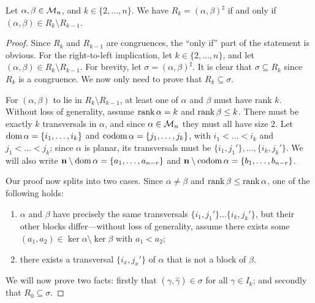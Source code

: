 \begin{lemma}
  \label{lem:rees-genpairs}
  Let $\alpha,\beta \in \mathcal{M}_n$, and $k \in \{2, \ldots, n\}$.  We have
  $R_k = (\alpha, \beta)^\sharp$ if and only if
  $(\alpha, \beta) \in R_k \setminus R_{k-1}$.
  \begin{proof}
    Since $R_k$ and $R_{k-1}$ are congruences, the ``only if'' part of the
    statement is obvious.  For the right-to-left implication, let
    $k \in \{2, \ldots, n\}$, and let
    $(\alpha, \beta) \in R_k \setminus R_{k-1}$.  For brevity, let
    $\sigma = (\alpha, \beta)^\sharp$.  It is clear that $\sigma \subseteq R_k$
    since $R_k$ is a congruence.  We now only need to prove that
    $R_k \subseteq \sigma$.

    For $(\alpha, \beta)$ to lie in $R_k \setminus R_{k-1}$, at least one of
    $\alpha$ and $\beta$ must have rank $k$.  Without loss of generality, assume
    $\operatorname{rank}\alpha = k$ and $\operatorname{rank}\beta \leq k$.  There must be exactly $k$
    transversals in $\alpha$, and since $\alpha \in \mathcal{M}_n$ they must all have
    size $2$.  Let $\operatorname{dom}\alpha = \{i_1, \ldots, i_k\}$ and
    $\operatorname{codom}\alpha = \{j_1, \ldots, j_k\}$, with $i_1 < \ldots < i_k$ and
    $j_1 < \ldots < j_k$; since $\alpha$ is planar, its transversals must be
    $\{i_1, j_1'\}, \ldots, \{i_k, j_k'\}$.  We will also write
    $\mathbf{n} \setminus \operatorname{dom}\alpha = \{a_1, \ldots, a_{n-r}\}$ and
    $\mathbf{n} \setminus \operatorname{codom}\alpha = \{b_1, \ldots, b_{n-r}\}$.

    Our proof now splits into two cases.  Since $\alpha \neq \beta$ and
    $\operatorname{rank}\beta \leq \operatorname{rank}\alpha$, one of the following holds:
    \begin{enumerate}[\rm(a)]
    \item $\alpha$ and $\beta$ have precisely the same transversals
      $\{i_1, j_1'\} \ldots \{i_k, j_k'\}$, but their other blocks
      differ---without loss of generality, assume there exists some
      $(a_1,a_2) \in \ker\alpha \setminus \ker\beta$ with $a_1 < a_2$;
    \item there exists a transversal $\{i_x,j_x'\}$ of $\alpha$ that is not a
      block of $\beta$.
    \end{enumerate}
    We will now prove two facts: firstly that
    $(\gamma, \widehat\gamma) \in \sigma$ for all $\gamma \in I_k$; and secondly
    that $R_0 \subseteq \sigma$.


\end{proof}
\end{lemma}
